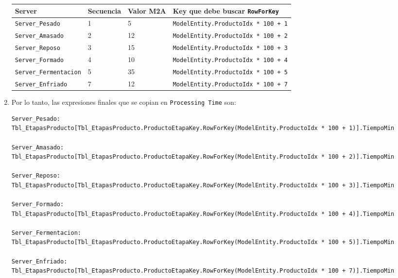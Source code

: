 \documentclass[11pt]{article}
\newcommand{\simio}[1]{\texttt{#1}}
\newcommand{\state}[1]{\texttt{#1}}
\begin{document}
\begin{enumerate}
  \begin{center}
  \small
  \begin{tabularx}{\linewidth}{L{38mm}C{22mm}C{24mm}Y}
  \toprule
  Server & Secuencia & Valor M2A & Key que debe buscar \simio{RowForKey} \\
  \midrule
  \simio{Server\_Pesado} & 1 & 5 & \state{ModelEntity.ProductoIdx * 100 + 1} \\
  \simio{Server\_Amasado} & 2 & 12 & \state{ModelEntity.ProductoIdx * 100 + 2} \\
  \simio{Server\_Reposo} & 3 & 15 & \state{ModelEntity.ProductoIdx * 100 + 3} \\
  \simio{Server\_Formado} & 4 & 10 & \state{ModelEntity.ProductoIdx * 100 + 4} \\
  \simio{Server\_Fermentacion} & 5 & 35 & \state{ModelEntity.ProductoIdx * 100 + 5} \\
  \simio{Server\_Enfriado} & 7 & 12 & \state{ModelEntity.ProductoIdx * 100 + 7} \\
  \bottomrule
  \end{tabularx}
  \end{center}

  \item Por lo tanto, las expresiones finales que se copian en \simio{Processing Time} son:
\begin{lstlisting}[language={},basicstyle=\ttfamily\scriptsize]
Server_Pesado:
Tbl_EtapasProducto[Tbl_EtapasProducto.ProductoEtapaKey.RowForKey(ModelEntity.ProductoIdx * 100 + 1)].TiempoMin

Server_Amasado:
Tbl_EtapasProducto[Tbl_EtapasProducto.ProductoEtapaKey.RowForKey(ModelEntity.ProductoIdx * 100 + 2)].TiempoMin

Server_Reposo:
Tbl_EtapasProducto[Tbl_EtapasProducto.ProductoEtapaKey.RowForKey(ModelEntity.ProductoIdx * 100 + 3)].TiempoMin

Server_Formado:
Tbl_EtapasProducto[Tbl_EtapasProducto.ProductoEtapaKey.RowForKey(ModelEntity.ProductoIdx * 100 + 4)].TiempoMin

Server_Fermentacion:
Tbl_EtapasProducto[Tbl_EtapasProducto.ProductoEtapaKey.RowForKey(ModelEntity.ProductoIdx * 100 + 5)].TiempoMin

Server_Enfriado:
Tbl_EtapasProducto[Tbl_EtapasProducto.ProductoEtapaKey.RowForKey(ModelEntity.ProductoIdx * 100 + 7)].TiempoMin
\end{lstlisting}


\end{enumerate}
\end{document}
